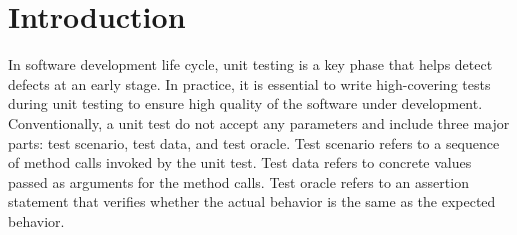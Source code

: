 \section{Introduction}
\label{sec:intro}

In software development life cycle, unit testing is a key phase that helps detect defects at an early stage. In practice, it is essential to write high-covering tests during unit testing to ensure high quality of the software under development. Conventionally, a unit test do not accept any parameters and include three major parts: test scenario, test data, and test oracle. Test scenario refers to a sequence of method calls invoked by the unit test. Test data refers to concrete values passed as arguments for the method calls. Test oracle refers to an assertion statement that verifies whether the actual behavior is the same as the expected behavior. 


